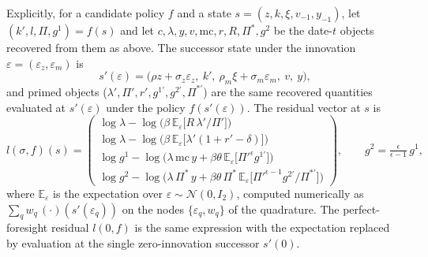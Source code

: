 \documentclass[11pt]{article}
\newcommand{\E}{\mathbb{E}}
\begin{document}
Explicitly, for a candidate policy $f$ and a state $s = (z, k, \xi, v_{-1}, y_{-1})$, let $(k', l, \Pi, g^1) = f(s)$ and let $c, \lambda, y, v, \mathrm{mc}, r, R, \Pi^*, g^2$ be the date-$t$ objects recovered from them as above. The successor state under the innovation $\varepsilon = (\varepsilon_z, \varepsilon_m)$ is
\begin{equation}
s'(\varepsilon) = \big( \rho z + \sigma_z \varepsilon_z,\ k',\ \rho_m \xi + \sigma_m \varepsilon_m,\ v,\ y \big),
\label{eq:successor}
\end{equation}
and primed objects ($\lambda', \Pi', r', g^{1\prime}, g^{2\prime}, \Pi^{*\prime}$) are the same recovered quantities evaluated at $s'(\varepsilon)$ under the policy $f(s'(\varepsilon))$. The residual vector at $s$ is
\begin{equation}
l(\sigma, f)(s) =
\begin{pmatrix}
\log \lambda - \log\Big( \beta\, \E_\varepsilon\big[ R\, \lambda' / \Pi' \big] \Big)\\[0.4em]
\log \lambda - \log\Big( \beta\, \E_\varepsilon\big[ \lambda' (1 + r' - \delta) \big] \Big)\\[0.4em]
\log g^1 - \log\Big( \lambda\, \mathrm{mc}\, y + \beta\theta\, \E_\varepsilon\big[ \Pi'^{\epsilon} g^{1\prime} \big] \Big)\\[0.4em]
\log g^2 - \log\Big( \lambda\, \Pi^*\, y + \beta\theta\, \Pi^*\, \E_\varepsilon\big[ \Pi'^{\epsilon-1} g^{2\prime} / \Pi^{*\prime} \big] \Big)
\end{pmatrix},
\qquad g^2 = \tfrac{\epsilon}{\epsilon-1}\, g^1,
\label{eq:residuals}
\end{equation}
where $\E_\varepsilon$ is the expectation over $\varepsilon \sim \mathcal{N}(0, I_2)$, computed numerically as $\sum_q w_q\, (\cdot)(s'(\varepsilon_q))$ on the nodes $\{\varepsilon_q, w_q\}$ of the quadrature. The perfect-foresight residual $l(0, f)$ is the same expression with the expectation replaced by evaluation at the single zero-innovation successor $s'(0)$. 
\end{document}
